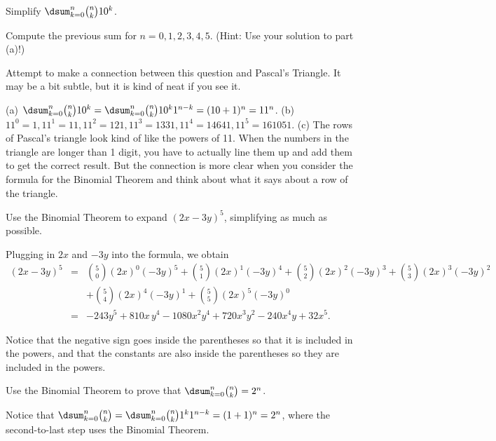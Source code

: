 \begin{requ}
\begin{lenum}
\item Simplify $\dsum_{k=0}^{n} \binom{n}{k}10^{k}$.
\item Compute the previous sum for $n=0,1,2,3,4,5$. (Hint: Use your solution to part (a)!)
\item Attempt to make a connection between this question and Pascal's Triangle.
It may be a bit subtle, but it is kind of neat if you see it.
\end{lenum}
\begin{requanswer}
(a) $\dsum_{k=0}^{n} \binom{n}{k}10^{k}= \dsum_{k=0}^{n} \binom{n}{k}10^{k}1^{n-k} = (10+1)^n=11^n$.
(b) $11^0=1, 11^1=11, 11^2=121, 11^3=1331, 11^4=14641, 11^5=161051$.
(c) The rows of Pascal's triangle look kind of like the powers of 11. When the numbers in the triangle are longer than 1 digit,
you have to actually line them up and add them to get the correct result. But the connection is more clear when you
consider the formula for the Binomial Theorem and think about what it says about a row of the triangle.
\end{requanswer}
\end{requ}

\begin{requ}
Use the Binomial Theorem to expand $(2x-3y)^5$, simplifying as much as possible.
\begin{requanswer}
Plugging in $2x$ and $-3y$ into the formula, we obtain
\begin{eqnarray*}
(2x-3y)^5 &=&
\binom{5}{0}(2x)^0(-3y)^5+
\binom{5}{1}(2x)^1(-3y)^4+
\binom{5}{2}(2x)^2(-3y)^3+
\binom{5}{3}(2x)^3(-3y)^2\\
&&+\binom{5}{4}(2x)^4(-3y)^1+\binom{5}{5}(2x)^5(-3y)^0\\
&=& -243y^5 + 810x\, y^4 - 1080x^2y^4+720x^3y^2-  240 x^4y+32x^5.
\end{eqnarray*} 

\noindent
Notice that the negative sign goes inside the parentheses so that it is included in the powers, and that the constants 
are also inside the parentheses so they are included in the powers.
\end{requanswer}
\end{requ}

\begin{requ}
Use the Binomial Theorem to prove that $\dsum_{k=0}^{n}\binom{n}{k}=2^n$.
\begin{requanswer}
Notice that $\dsum_{k=0}^{n}\binom{n}{k}= \dsum_{k=0}^{n}\binom{n}{k}1^k1^{n-k}=(1+1)^n=2^n$,
where the second-to-last step uses the Binomial Theorem.
\end{requanswer}
\end{requ}


